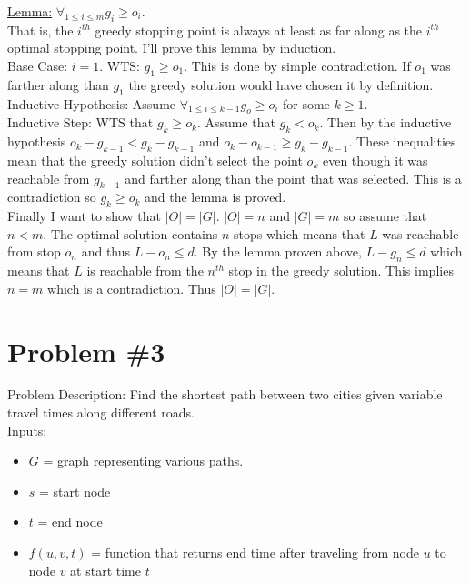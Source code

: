 \documentclass{article}
\begin{document}
\underline{Lemma:} $\forall_{1\le i\le m} g_i \ge o_i$. \\

That is, the $i^{th}$ greedy stopping point is always at least as far along as the $i^{th}$ optimal stopping point. I'll prove this lemma by induction.\\

Base Case: $i=1$. WTS: $g_1 \ge o_1$. This is done by simple contradiction. If $o_1$ was farther along than $g_1$ the greedy solution would have chosen it by definition.\\

Inductive Hypothesis: Assume $\forall_{1\le i\le k-1} g_o \ge o_i$ for some $k\ge 1$. \\

Inductive Step: WTS that $g_k \ge o_k$. Assume that $g_k < o_k$. Then by the inductive hypothesis $o_k - g_{k-1} < g_k - g_{k-1}$ and $o_k - o_{k-1} \ge g_k - g_{k-1}$. These inequalities mean that the greedy solution didn't select the point $o_k$ even though it was reachable from $g_{k-1}$ and farther along than the point that was selected. This is a contradiction so $g_k \ge o_k$ and the lemma is proved.\\

Finally I want to show that $|O|=|G|$. $|O| = n$ and $|G| = m$ so assume that $n < m$. The optimal solution contains $n$ stops which means that $L$ was reachable from stop $o_n$ and thus $L - o_n \le d$. By the lemma proven above, $L - g_n \le d$ which means that $L$ is reachable from the $n^{th}$ stop in the greedy solution. This implies $n=m$ which is a contradiction. Thus $|O| = |G|$.

\section*{Problem \#3}
Problem Description: Find the shortest path between two cities given variable travel times along different roads.\\

Inputs:
\begin{itemize}
    \item $G$ = graph representing various paths.
    \item $s$ = start node
    \item $t$ = end node
    \item $f(u, v, t)$ = function that returns end time after traveling from node $u$ to node $v$ at start time $t$
\end{itemize}
\end{document}
